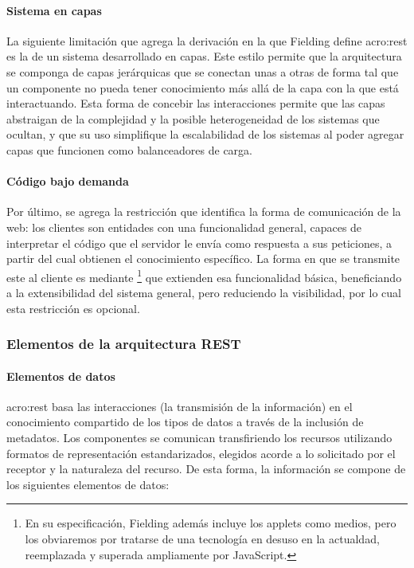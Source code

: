\paragraph{Sistema en capas}

La siguiente limitación que agrega la derivación en la que Fielding define \gls{acro:rest} es la de un sistema desarrollado en capas. Este estilo permite que la arquitectura se componga de capas jerárquicas que se conectan unas a otras de forma tal que un componente no pueda tener conocimiento más allá de la capa con la que está interactuando. Esta forma de concebir las interacciones permite que las capas abstraigan de la complejidad y la posible heterogeneidad de los sistemas que ocultan, y que su uso simplifique la escalabilidad de los sistemas al poder agregar capas que funcionen como balanceadores de carga.


\paragraph{Código bajo demanda}

Por último, se agrega la restricción que identifica la forma de comunicación de la web: los clientes son entidades con una funcionalidad general, capaces de interpretar el código que el servidor le envía como respuesta a sus peticiones, a partir del cual obtienen el conocimiento específico. La forma en que se transmite este  al cliente es mediante \footnote{En su especificación, Fielding además incluye los applets como medios, pero los obviaremos por tratarse de una tecnología en desuso en la actualdad, reemplazada y superada ampliamente por JavaScript.} que extienden esa funcionalidad básica, beneficiando a la extensibilidad del sistema general, pero reduciendo la visibilidad, por lo cual esta restricción es opcional.


\subsubsection{Elementos de la arquitectura REST}
\label{standard:rest:elementos}

\paragraph{Elementos de datos}

\gls{acro:rest} basa las interacciones (la transmisión de la información) en el conocimiento compartido de los tipos de datos a través de la inclusión de metadatos. Los componentes se comunican transfiriendo los recursos utilizando formatos de representación estandarizados, elegidos acorde a lo solicitado por el receptor y la naturaleza del recurso. De esta forma, la información se compone de los siguientes elementos de datos:

